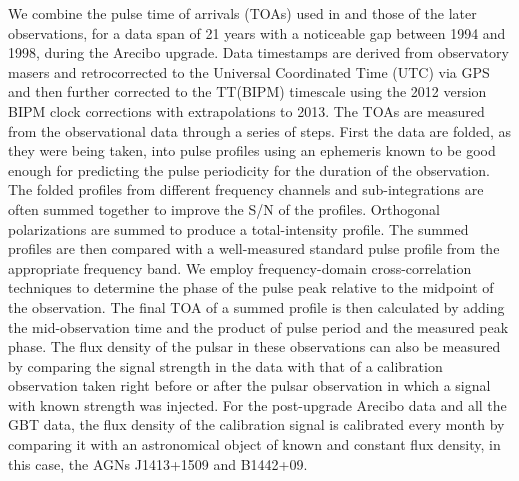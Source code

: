 We combine the pulse time of arrivals (TOAs) used in \citealt{sns+05} and those
of the later observations, for a data span of 21 years with a
noticeable gap between 1994 and 1998, during the Arecibo upgrade.
Data timestamps are derived from observatory masers and retrocorrected
to the Universal Coordinated Time (UTC) via GPS and then further
corrected to the TT(BIPM) timescale using the 2012 version BIPM clock corrections with extrapolations to 2013.
The TOAs are measured from the observational data through a series of
steps. First the data are folded, as they were being taken, into pulse
profiles using an ephemeris known to be good enough for predicting the
pulse periodicity for the duration of the observation. The folded
profiles from different frequency channels and sub-integrations are
often summed together to improve the S/N of the profiles.  Orthogonal
polarizations are summed to produce a total-intensity profile.
The summed profiles are then compared with a well-measured standard
pulse profile from the appropriate frequency band. We employ
frequency-domain cross-correlation techniques \citep{tay92} to determine the phase of the pulse peak relative to the midpoint of the observation. The final TOA of a summed profile is then calculated by adding the mid-observation time and the product of pulse period and the measured peak phase.
The flux density of the pulsar in these observations can also be
measured by comparing the signal strength in the data with that of a
calibration observation taken right before or after the pulsar
observation in which a signal with known strength was injected. For
the post-upgrade Arecibo data and all the GBT data, the
flux density of the calibration signal is calibrated every month by
comparing it with an astronomical object of known and constant flux
density, in this case, the AGNs J1413+1509 and B1442+09.




